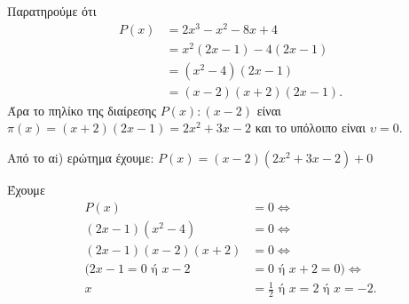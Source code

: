 \begin{alist}
\item 
\begin{rlist}
\item Παρατηρούμε ότι
\begin{align*}
P(x) &= 2x^3 - x^2 - 8x + 4 \\
&= x^2(2x-1) - 4(2x-1) \\
&= (x^2 - 4)(2x-1) \\
&= (x-2)(x+2)(2x-1).
\end{align*}
Άρα το πηλίκο της διαίρεσης $P(x) : (x-2)$ είναι $\pi(x) = (x+2)(2x-1) = 2x^2 + 3x - 2$ και το υπόλοιπο είναι $\upsilon = 0$.
\item Από το αi) ερώτημα έχουμε: $P(x) = (x-2)(2x^2 + 3x - 2) + 0$
\end{rlist}
\item Έχουμε
\begin{align*}
P(x) &= 0 \Leftrightarrow \\
(2x-1)(x^2 - 4) &= 0 \Leftrightarrow \\
(2x-1)(x-2)(x+2) &= 0 \Leftrightarrow \\
(2x-1 = 0 \text{ ή } x-2 &= 0 \text{ ή } x+2 = 0) \Leftrightarrow \\
x &= \frac{1}{2} \text{ ή } x = 2 \text{ ή } x = -2.
\end{align*}
\end{alist}

